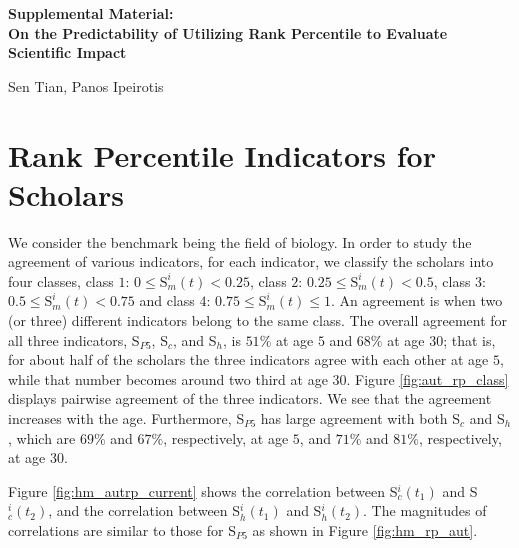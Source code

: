 \clearpage
\begin{refsection}
\beginsupplement
\appendix
{}
\begin{center}
\textbf{\large Supplemental Material: \\ On the Predictability of Utilizing Rank Percentile to Evaluate Scientific Impact}

Sen Tian, Panos Ipeirotis
\end{center}

\section{Rank Percentile Indicators for Scholars}
\label{sec:suppl_similarity_autrp}

We consider the benchmark being the field of biology. In order to study the agreement of various indicators, for each indicator, we classify the scholars into four classes, class $1$: $0\le \text{S}_m^{i}(t) < 0.25$, class $2$: $0.25\le \text{S}_m^{i}(t) < 0.5$, class $3$: $0.5 \le \text{S}_m^{i}(t) < 0.75$ and class $4$: $0.75 \le \text{S}_m^{i}(t) \le 1$. An agreement is when two (or three) different indicators belong to the same class. The overall agreement for all three indicators, S$_{P5}$, S$_c$, and S$_h$, is $51\%$ at age $5$ and $68\%$ at age $30$; that is, for about half of the scholars the three indicators agree with each other at age $5$, while that number becomes around two third at age $30$. Figure \ref{fig:aut_rp_class} displays pairwise agreement of the three indicators. We see that the agreement increases with the age. Furthermore, S$_{P5}$ has large agreement with both S$_{c}$ and S$_{h}$, which are $69\%$ and $67\%$, respectively, at age $5$, and $71\%$ and $81\%$, respectively, at age $30$. 

Figure \ref{fig:hm_autrp_current} shows the correlation between S$_c^{i}(t_1)$ and S$_c^{i}(t_2)$, and the correlation between S$_h^{i}(t_1)$ and S$_h^{i}(t_2)$. The magnitudes of correlations are similar to those for S$_{P5}$ as shown in Figure \ref{fig:hm_rp_aut}.


\end{refsection}
